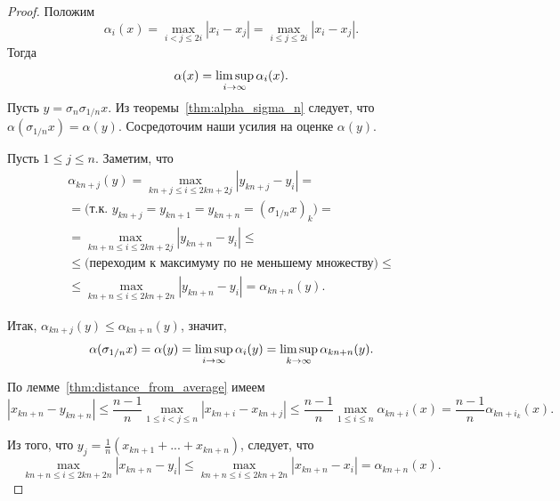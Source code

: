 \begin{proof}
	Положим
	\begin{equation}
		\alpha_i(x) =
		\max_{i<j\leqslant 2i} |x_i - x_j| =
		\max_{i\leqslant j\leqslant 2i} |x_i - x_j|
		.
	\end{equation}
	Тогда
	\begin{equation}
		\alpha(x) = \varlimsup_{i\to\infty} \alpha_i(x)
		.
	\end{equation}
	Пусть $y=\sigma_n \sigma_{1/n} x$.
	Из теоремы~\ref{thm:alpha_sigma_n} следует, что $\alpha(\sigma_{1/n} x)=\alpha(y)$.
	Сосредоточим наши усилия на оценке $\alpha(y)$.

	Пусть $1\leq j \leq n$.
	Заметим, что
	\begin{multline}
		\alpha_{kn+j}(y)
		=
		\max_{kn+j \leq i \leq 2kn+2j } |y_{kn+j} - y_i|
		=
		\\=
		\mbox{(т.к. $y_{kn+j}=y_{kn+1}=y_{kn+n} = (\sigma_{1/n}x)_k$)}
		=
		\\=
		\max_{kn+n \leq i \leq 2kn+2j } |y_{kn+n} - y_i|
		\leq
		\\\leq
		\mbox{(переходим к максимуму по не меньшему множеству)}
		\leq
		\\\leq
		\max_{kn+n \leq i \leq 2kn+2n } |y_{kn+n} - y_i|
		=
		\alpha_{kn+n}(y)
		.
	\end{multline}

	Итак, $\alpha_{kn+j}(y) \leq \alpha_{kn+n}(y)$,
	значит,
	\begin{equation}
		\label{eq:alpha_sigma_1_n_subseq_limsup}
		\alpha(\sigma_{1/n}x) = \alpha(y) = \varlimsup_{i\to\infty} \alpha_i(y)
		=
		\varlimsup_{k\to\infty} \alpha_{kn+n}(y)
		.
	\end{equation}

	По лемме~\ref{thm:distance_from_average} имеем
	\begin{equation}
		\label{eq:alpha_sigma_1_n_distance}
		|x_{kn+n}-y_{kn+n}|
		\leq
		\frac{n-1}{n}\max_{1\leq i<j \leq n}|x_{kn+i}-x_{kn+j}|
		\leq
		\frac{n-1}{n} \max_{1\leq i \leq n} \alpha_{kn+i}(x)
		=
		\frac{n-1}{n}\alpha_{kn+i_k}(x)
		.
	\end{equation}

	Из того, что $y_j = \frac{1}{n}(x_{kn+1}+...+x_{kn+n})$,
	следует, что
	\begin{equation}
		\label{eq:alpha_sigma_1_n_alpha_x}
		\max_{kn+n \leq i \leq 2kn+2n } |x_{kn+n} - y_i|
		\leq
		\max_{kn+n \leq i \leq 2kn+2n } |x_{kn+n} - x_i|
		=
		\alpha_{kn+n}(x)
		.
	\end{equation}


\end{proof}
